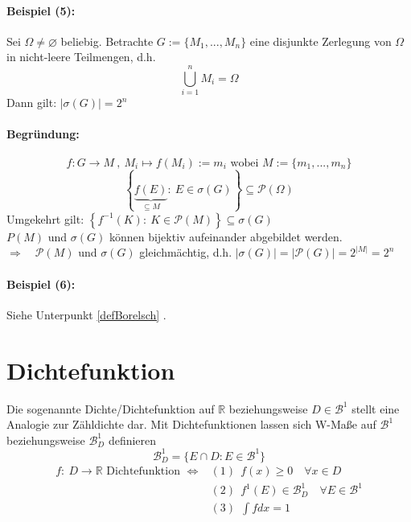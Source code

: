 \documentclass[12pt,a4paper]{article}
\begin{document}
	\paragraph{Beispiel (5):}
	Sei $\Omega\neq\varnothing$ beliebig. Betrachte $G:=\{ M_1 , ..., M_n\}$ eine disjunkte Zerlegung von $\Omega$ in nicht-leere Teilmengen, d.h.
	$$\bigcup_{i=1}^n M_i = \Omega$$
	Dann gilt: $\displaystyle \left| \sigma(G)\right| = 2^n$
	\paragraph{Begründung:}
	$$f:G \rightarrow M \: , \: M_i \longmapsto f(M_i):=m_i \text{ wobei } M:=\{m_1,...,m_n\}$$
	$$\left\{\underbrace{f(E)}_{\subseteq M} : \: E\in\sigma (G)\right\} \subseteq \mathcal P(\Omega)$$	
	Umgekehrt gilt: $\displaystyle \left\{f^{-1}(K): \: K\in\mathcal{P}(M)\right\}\subseteq \sigma(G)$ \\
	$P(M)$ und $\sigma(G)$ können bijektiv aufeinander abgebildet werden. \\
	$\Rightarrow \quad \mathcal{P}(M)$ und $\sigma (G)$ gleichmächtig, d.h. $|\sigma (G)|=|\mathcal{P}(G)|=2^{|M|}=2^n$
	\paragraph{Beispiel (6):}	
	Siehe Unterpunkt \ref{defBorelsch} .
	
	\section*{Dichtefunktion}
	Die sogenannte Dichte/Dichtefunktion auf $\mathbb{R}$ beziehungsweise $D\in\mathcal{B}^1$ stellt eine Analogie zur Zähldichte dar. Mit Dichtefunktionen lassen sich W-Maße auf $\mathcal{B}^1$ beziehungsweise $\mathcal{B}^1_D$ definieren
	$$\mathcal{B}^1_D = \{E\cap D : E\in\mathcal{B}^1\}$$
	$$$$
	\begin{align*}
	f:\: D\rightarrow\mathbb{R} \text{ Dichtefunktion }  \Leftrightarrow & (1)\:\: f(x)\geq 0 \quad \forall x\in D\\
	& (2)\:\: f^1(E)\in\mathcal{B}^1_D \quad \forall E\in\mathcal{B}^1\\
	& (3)\:\: \int fdx = 1
	\end{align*}
	
\end{document}
